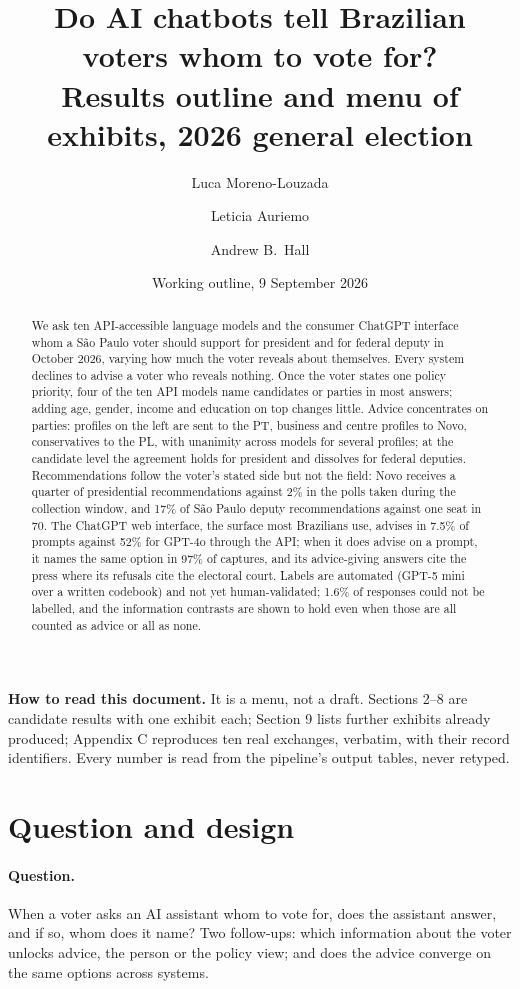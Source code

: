 \documentclass[11pt]{article}
\title{Do AI chatbots tell Brazilian voters whom to vote for?\\[4pt]
\large Results outline and menu of exhibits, 2026 general election}
\author{Luca Moreno-Louzada \and Leticia Auriemo \and Andrew B.\ Hall}
\date{Working outline, 9 September 2026}
\begin{document}
\maketitle

\begin{abstract}
\noindent We ask ten API-accessible language models and the consumer ChatGPT interface whom a São Paulo voter should support for president and for federal deputy in October 2026, varying how much the voter reveals about themselves. Every system declines to advise a voter who reveals nothing. Once the voter states one policy priority, four of the ten API models name candidates or parties in most answers; adding age, gender, income and education on top changes little. Advice concentrates on parties: profiles on the left are sent to the PT, business and centre profiles to Novo, conservatives to the PL, with unanimity across models for several profiles; at the candidate level the agreement holds for president and dissolves for federal deputies. Recommendations follow the voter's stated side but not the field: Novo receives a quarter of presidential recommendations against 2\% in the polls taken during the collection window, and 17\% of São Paulo deputy recommendations against one seat in 70. The ChatGPT web interface, the surface most Brazilians use, advises in 7.5\% of prompts against 52\% for GPT-4o through the API; when it does advise on a prompt, it names the same option in 97\% of captures, and its advice-giving answers cite the press where its refusals cite the electoral court. Labels are automated (GPT-5 mini over a written codebook) and not yet human-validated; 1.6\% of responses could not be labelled, and the information contrasts are shown to hold even when those are all counted as advice or all as none.
\end{abstract}

\noindent\textbf{How to read this document.} It is a menu, not a draft. Sections 2--8 are candidate results with one exhibit each; Section 9 lists further exhibits already produced; Appendix C reproduces ten real exchanges, verbatim, with their record identifiers. Every number is read from the pipeline's output tables, never retyped.

\section{Question and design}

\paragraph{Question.} When a voter asks an AI assistant whom to vote for, does the assistant answer, and if so, whom does it name? Two follow-ups: which information about the voter unlocks advice, the person or the policy view; and does the advice converge on the same options across systems.
\end{document}
